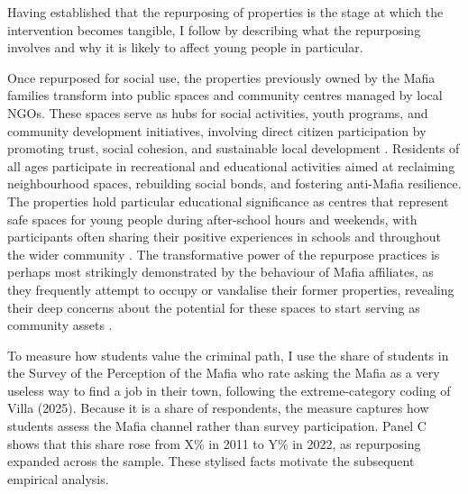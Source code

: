 \documentclass[12pt]{article}
\theoremstyle{plain}
\theoremstyle{plain}
\theoremstyle{plain}
\theoremstyle{definition}
\theoremstyle{plain}
\theoremstyle{definition}
\theoremstyle{plain}
\theoremstyle{remark}
\theoremstyle{definition}
\theoremstyle{definition}
\theoremstyle{plain}
\begin{document}
 Having established that the repurposing of properties is the stage at which the intervention becomes tangible, I follow by describing what the repurposing involves and why it is likely to affect young people in particular.\par
 Once repurposed for social use, the properties previously owned by the Mafia families transform into public spaces and community centres managed by local NGOs. These spaces serve as hubs for social activities, youth programs, and community development initiatives, involving direct citizen participation by promoting trust, social cohesion, and sustainable local development \citep{nazzaro_il_2021, falcone_beneitalia_2016}. Residents of all ages participate in recreational and educational activities aimed at reclaiming neighbourhood spaces, rebuilding social bonds, and fostering anti-Mafia resilience. The properties hold particular educational significance as centres that represent safe spaces for young people during after-school hours and weekends, with participants often sharing their positive experiences in schools and throughout the wider community \citep{nazzaro_il_2021}. The transformative power of the repurpose practices is perhaps most strikingly demonstrated by the behaviour of Mafia affiliates, as they frequently attempt to occupy or vandalise their former properties, revealing their deep concerns about the potential for these spaces to start serving as community assets \citep{italian_ministry_of_justice_carta_2018}.

To measure how students value the criminal path, I use the share of students in the Survey of the Perception of the Mafia who rate asking the Mafia as a very useless way to find a job in their town, following the extreme-category coding of Villa (2025). Because it is a share of respondents, the measure captures how students assess the Mafia channel rather than survey participation. Panel C shows that this share rose from X\% in 2011 to Y\% in 2022, as repurposing expanded across the sample. These stylised facts motivate the subsequent empirical analysis.


\vspace{0.6cm}
\end{document}
